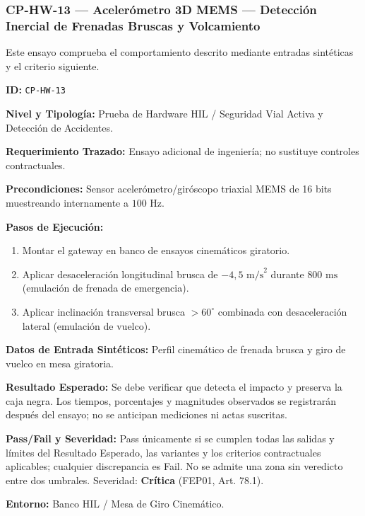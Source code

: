 \subsubsection*{CP-HW-13 — Acelerómetro 3D MEMS — Detección Inercial de Frenadas Bruscas y Volcamiento}\label{sec:9-cp-hw-13}
Este ensayo comprueba el comportamiento descrito mediante entradas sintéticas y el criterio siguiente.

\par\noindent\textbf{ID:} \texttt{C\allowbreak{}P\allowbreak{}-\allowbreak{}H\allowbreak{}W\allowbreak{}-\allowbreak{}1\allowbreak{}3\allowbreak{}}\par
\par\noindent\textbf{Nivel y Tipología:} Prueba de Hardware HIL / Seguridad Vial Activa y Detección de Accidentes.\par
\par\noindent\textbf{Requerimiento Trazado:} Ensayo adicional de ingeniería; no sustituye controles contractuales.\par
\par\noindent\textbf{Precondiciones:} Sensor acelerómetro/giróscopo triaxial MEMS de 16 bits muestreando internamente a \(100\text{ Hz}\).\par
\par\noindent\textbf{Pasos de Ejecución:} \par
\begin{enumerate}
\item Montar el gateway en banco de ensayos cinemáticos giratorio.
\item Aplicar desaceleración longitudinal brusca de \(-4{,}5\text{ m/s}^2\) durante \(800\text{ ms}\) (emulación de frenada de emergencia).
\item Aplicar inclinación transversal brusca \(> 60^\circ\) combinada con desaceleración lateral (emulación de vuelco).
\end{enumerate}
\par\noindent\textbf{Datos de Entrada Sintéticos:} Perfil cinemático de frenada brusca y giro de vuelco en mesa giratoria.\par
\par\noindent\textbf{Resultado Esperado:} Se debe verificar que detecta el impacto y preserva la caja negra. Los tiempos, porcentajes y magnitudes observados se registrarán después del ensayo; no se anticipan mediciones ni actas suscritas.\par
\par\noindent\textbf{Pass/Fail y Severidad:} Pass únicamente si se cumplen todas las salidas y límites del Resultado Esperado, las variantes y los criterios contractuales aplicables; cualquier discrepancia es Fail. No se admite una zona sin veredicto entre dos umbrales. Severidad: \textbf{Crítica} (FEP01, Art. 78.1).\par
\par\noindent\textbf{Entorno:} Banco HIL / Mesa de Giro Cinemático.\par






